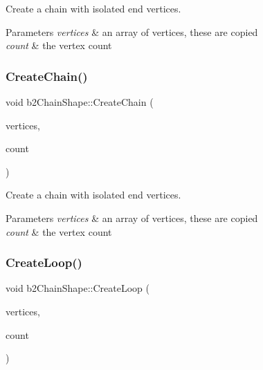 Create a chain with isolated end vertices. 
\begin{DoxyParams}{Parameters}
{\em vertices} & an array of vertices, these are copied \\
\hline
{\em count} & the vertex count \\
\hline
\end{DoxyParams}
\mbox{\label{classb2ChainShape_aa0977339b743c05f2179939ccc38e7e0}} 
\subsubsection{\texorpdfstring{Create\+Chain()}{CreateChain()}\hspace{0.1cm}{\footnotesize\ttfamily [2/2]}}
{\footnotesize\ttfamily void b2\+Chain\+Shape\+::\+Create\+Chain (\begin{DoxyParamCaption}\item[{const \hyperlink{structb2Vec2}{b2\+Vec2} $\ast$}]{vertices,  }\item[{int32}]{count }\end{DoxyParamCaption})}

Create a chain with isolated end vertices. 
\begin{DoxyParams}{Parameters}
{\em vertices} & an array of vertices, these are copied \\
\hline
{\em count} & the vertex count \\
\hline
\end{DoxyParams}
\mbox{\label{classb2ChainShape_ac257742a52cac391e25962a4c703fb06}} 
\subsubsection{\texorpdfstring{Create\+Loop()}{CreateLoop()}\hspace{0.1cm}{\footnotesize\ttfamily [1/2]}}
{\footnotesize\ttfamily void b2\+Chain\+Shape\+::\+Create\+Loop (\begin{DoxyParamCaption}\item[{const \hyperlink{structb2Vec2}{b2\+Vec2} $\ast$}]{vertices,  }\item[{int32}]{count }\end{DoxyParamCaption})}

